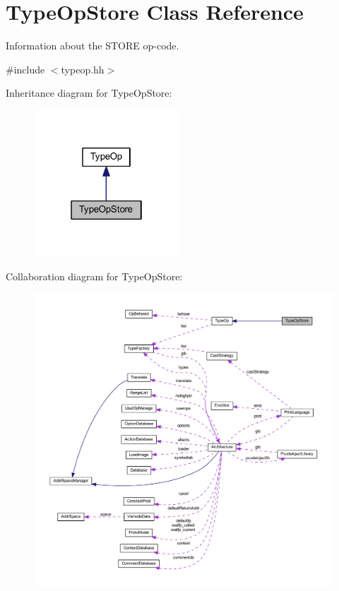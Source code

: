 \hypertarget{class_type_op_store}{}\section{Type\+Op\+Store Class Reference}
\label{class_type_op_store}


Information about the S\+T\+O\+RE op-\/code.  




{\ttfamily \#include $<$typeop.\+hh$>$}



Inheritance diagram for Type\+Op\+Store\+:
\nopagebreak
\begin{figure}[H]
\begin{center}
\leavevmode
\includegraphics[width=154pt]{class_type_op_store__inherit__graph}
\end{center}
\end{figure}


Collaboration diagram for Type\+Op\+Store\+:
\nopagebreak
\begin{figure}[H]
\begin{center}
\leavevmode
\includegraphics[width=350pt]{class_type_op_store__coll__graph}
\end{center}
\end{figure}

